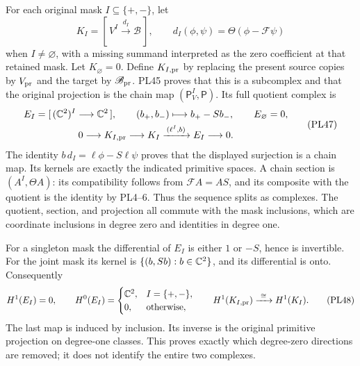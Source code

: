 For each original mask \(I\subseteq\{+,-\}\), let
\[
 K_I=[\,V^{I}\xrightarrow{\,d_I\,}\mathscr B\,],\qquad
 d_I(\phi,\psi)=\Theta(\phi-\mathcal F\psi)
 \tag{PL46}
\]
when \(I\ne\varnothing\), with a missing summand interpreted as
the zero coefficient at that retained mask. Let \(K_\varnothing=0\).
Define \(K_{I,\rm pr}\) by replacing the present source copies by
\(V_{\rm pr}\) and the target by \(\mathscr B_{\rm pr}\).
PL45 proves that this is a subcomplex and that the original
projection is the chain map
\((\mathsf P_V^{I},\mathsf P)\).
Its full quotient complex is
\[
 \begin{gathered}
 E_I=[\,(\mathbb C^2)^{I}\longrightarrow\mathbb C^2\,],\qquad
 (b_+,b_-)\longmapsto b_+-Sb_-,\qquad E_\varnothing=0,\\
 0\longrightarrow K_{I,\rm pr}\longrightarrow K_I
       \xrightarrow{\,(\ell^{I},b)\,}E_I\longrightarrow0 .
 \end{gathered}
 \tag{PL47}\label{pl:pl:endpoint-complex}
\]
The identity \(b\,d_I=\ell\phi-S\ell\psi\) proves that the
displayed surjection is a chain map. Its kernels are exactly
the indicated primitive spaces. A chain section is
\((A^{I},\Theta A)\): its compatibility follows from
\(\mathcal F A=AS\), and its composite with the quotient is the
identity by PL4--6. Thus the sequence splits as complexes.
The quotient, section, and projection all commute with the mask
inclusions, which are coordinate inclusions in degree zero and
identities in degree one.

For a singleton mask the differential of \(E_I\) is either
\(1\) or \(-S\), hence is invertible. For the joint mask its kernel
is \(\{(b,Sb):b\in\mathbb C^2\}\), and its differential is onto. Consequently
\[
 H^1(E_I)=0,\qquad
 H^0(E_I)=
 \begin{cases}\mathbb C^2,& I=\{+,-\},\\0,&\text{otherwise},\end{cases}
 \qquad
 H^1(K_{I,\rm pr})\xrightarrow{\ \cong\ }H^1(K_I).
 \tag{PL48}\label{pl:pl:endpoint-cohomology}
\]
The last map is induced by inclusion. Its inverse is the original
primitive projection on degree-one classes. This proves exactly
which degree-zero directions are removed; it does not identify the
entire two complexes.


